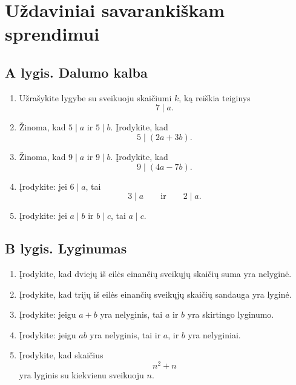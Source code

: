 \documentclass[11pt,a4paper]{scrartcl}
\begin{document}
\section{Uždaviniai savarankiškam sprendimui}

\subsection{A lygis. Dalumo kalba}

\begin{enumerate}
    \renewcommand{\labelenumi}{\textbf{\theenumi.}}

    \item Užrašykite lygybe su sveikuoju skaičiumi $k$, ką reiškia teiginys
    \[
    7\mid a.
    \]

    \item Žinoma, kad $5\mid a$ ir $5\mid b$. Įrodykite, kad
    \[
    5\mid(2a+3b).
    \]

    \item Žinoma, kad $9\mid a$ ir $9\mid b$. Įrodykite, kad
    \[
    9\mid(4a-7b).
    \]

    \item Įrodykite: jei $6\mid a$, tai
    \[
    3\mid a
    \qquad\text{ir}\qquad
    2\mid a.
    \]

    \item Įrodykite: jei $a\mid b$ ir $b\mid c$, tai $a\mid c$.

\end{enumerate}

\subsection{B lygis. Lyginumas}

\begin{enumerate}
    \renewcommand{\labelenumi}{\textbf{\theenumi.}}
    \setcounter{enumi}{5}

    \item Įrodykite, kad dviejų iš eilės einančių sveikųjų skaičių suma yra
    nelyginė.

    \item Įrodykite, kad trijų iš eilės einančių sveikųjų skaičių sandauga
    yra lyginė.

    \item Įrodykite: jeigu $a+b$ yra nelyginis, tai $a$ ir $b$ yra skirtingo
    lyginumo.

    \item Įrodykite: jeigu $ab$ yra nelyginis, tai ir $a$, ir $b$ yra
    nelyginiai.

    \item Įrodykite, kad skaičius
    \[
    n^2+n
    \]
    yra lyginis su kiekvienu sveikuoju $n$.

\end{enumerate}
\end{document}

